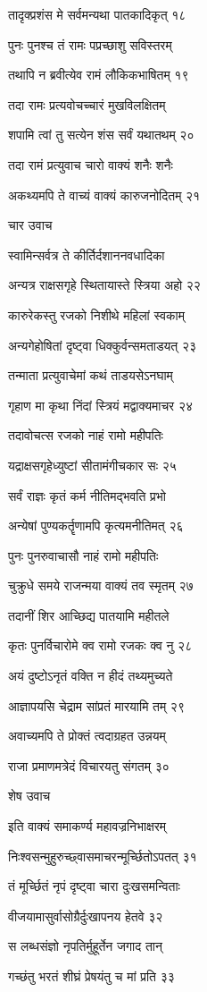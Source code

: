 तादृक्प्रशंस मे सर्वमन्यथा पातकादिकृत् १८

पुनः पुनश्च तं रामः पप्रच्छाशु सविस्तरम्

तथापि न ब्रवीत्येव रामं लौकिकभाषितम् १९

तदा रामः प्रत्यवोचच्चारं मुखविलक्षितम्

शपामि त्वां तु सत्येन शंस सर्वं यथातथम् २०

तदा रामं प्रत्युवाच चारो वाक्यं शनैः शनैः

अकथ्यमपि ते वाच्यं वाक्यं कारुजनोदितम् २१

चार उवाच

स्वामिन्सर्वत्र ते कीर्तिर्दशाननवधादिका

अन्यत्र राक्षसगृहे स्थितायास्ते स्त्रिया अहो २२

कारुरेकस्तु रजको निशीथे महिलां स्वकाम्

अन्यगेहोषितां दृष्ट्वा धिक्कुर्वन्समताडयत् २३

तन्माता प्रत्युवाचेमां कथं ताडयसेऽनघाम्

गृहाण मा कृथा निंदां स्त्रियं मद्वाक्यमाचर २४

तदावोचत्स रजको नाहं रामो महीपतिः

यद्राक्षसगृहेध्युष्टां सीतामंगीचकार सः २५

सर्वं राज्ञः कृतं कर्म नीतिमद्भवति प्रभो

अन्येषां पुण्यकर्तॄणामपि कृत्यमनीतिमत् २६

पुनः पुनरुवाचासौ नाहं रामो महीपतिः

चुक्रुधे समये राजन्मया वाक्यं तव स्मृतम् २७

तदानीं शिर आच्छिद्य पातयामि महीतले

कृतः पुनर्विचारोमे क्व रामो रजकः क्व नु २८

अयं दुष्टोऽनृतं वक्ति न हीदं तथ्यमुच्यते

आज्ञापयसि चेद्राम सांप्रतं मारयामि तम् २९

अवाच्यमपि ते प्रोक्तं त्वदाग्रहत उन्नयम्

राजा प्रमाणमत्रेदं विचारयतु संगतम् ३०

शेष उवाच

इति वाक्यं समाकर्ण्य महावज्रनिभाक्षरम्

निःश्वसन्मुहुरुच्छ्वासमाचरन्मूर्च्छितोऽपतत् ३१

तं मूर्च्छितं नृपं दृष्ट्वा चारा दुःखसमन्विताः

वीजयामासुर्वासोग्रैर्दुःखापनय हेतवे ३२

स लब्धसंज्ञो नृपतिर्मुहूर्तेन जगाद तान्

गच्छंतु भरतं शीघ्रं प्रेषयंतु च मां प्रति ३३

